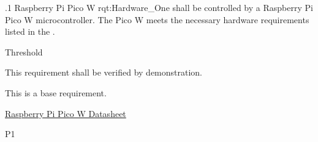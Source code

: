 \ONERQMTV
{\RqtNumberBase.1}
{Raspberry Pi Pico W}
{rqt:Hardware_One}
{\ThisSys shall be controlled by a Raspberry Pi Pico W microcontroller. The Pico W meets the necessary hardware requirements listed in the \citeExProjSPS.}
{
	\item [All Phases] Threshold
}
{This requirement shall be verified by demonstration.}
{
\item [N/A] This is a base requirement.
}
{
	\item \href{https://datasheets.raspberrypi.com/picow/pico-w-datasheet.pdf}{Raspberry Pi Pico W Datasheet}
}
{P1}

